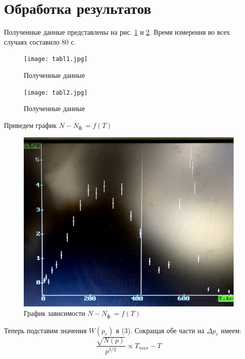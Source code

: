 \documentclass[a4paper, 12pt]{article}
\begin{document}
\section{Обработка результатов}
Полученные данные представлены на рис. \ref{fig:tabl1} и \ref{fig:tabl2}. Время измерения во всех случаях составило $80$ с.

\begin{figure}[H]
    \centering
    \texttt{[image: tabl1.jpg]}
    \caption{Полученные данные}
    \label{fig:tabl1}
\end{figure}

\begin{figure}[H]
    \centering
    \texttt{[image: tabl2.jpg]}
    \caption{Полученные данные}
    \label{fig:tabl2}
\end{figure}
Приведем график $N - N_{\text{ф.}} = f(T)$
\begin{figure}[H]
    \centering
    \includegraphics[width=1\textwidth]{NbyT.jpg}
    \caption{График зависимости $N - N_{\text{ф.}} = f(T)$}
    \label{fig:NbyT}
\end{figure}

Теперь подставим значения $W(p_e)$ в (3). Сокращая обе части на $\Delta p_e$ имеем:
\begin{equation}
	\frac{\sqrt{N(p)}}{p^{3/2}} \propto T_{max} - T
\end{equation}
\end{document}
